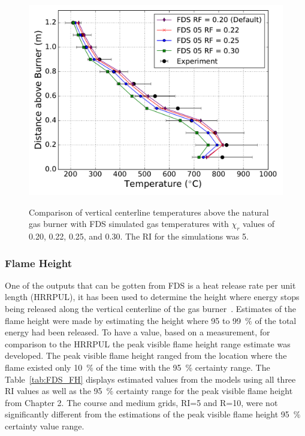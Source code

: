 \documentclass[twoside]{uocthesis}
\begin{document}
{\begin{figure}
	\includegraphics[width=5in]{../Figures/FHNG01_RF_RI5} \\
	\caption[Comparison of vertical centerline temperatures above the natural gas burner with FDS simulated gas temperatures based on varied $\chi_r$.]{Comparison of vertical centerline temperatures above the natural gas burner with FDS simulated gas temperatures with $\chi_r$ values of 0.20, 0.22, 0.25, and 0.30.  The RI for the simulations was 5.}
	\label{FHNG01_RF_RI5}
\end{figure}

\subsubsection{Flame Height}

One of the outputs that can be gotten from FDS is a heat release rate per unit length (HRRPUL), it has been used to determine the height where energy stops being released along the vertical centerline of the gas burner~\cite{McDermott:2011}.  Estimates of the flame height were made by estimating the height where 95 to 99~$\%$ of the total energy had been released. To have a value, based on a measurement, for comparison to the HRRPUL the peak visible flame height range estimate was developed.  The peak visible flame height ranged from the location where the flame existed only 10~\% of the time with the 95~\% certainty range.  The Table~\ref{tab:FDS_FH} displays estimated values from the models using all three RI values as well as the 95~$\%$ certainty range for the peak visible flame height from Chapter 2.  The course and medium grids, RI=5 and R=10, were not significantly different from the estimations of the peak visible flame height 95~$\%$ certainty value range.     

}
\end{document}

